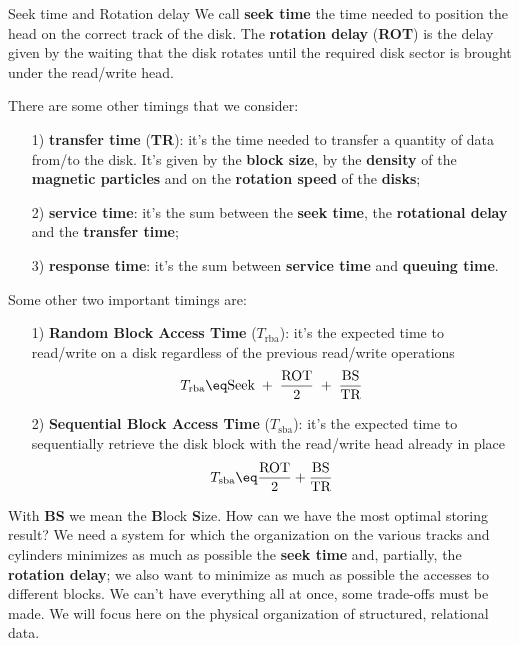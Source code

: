 \begin{definition}{Seek time and Rotation delay}
    We call \textbf{seek time} the time needed to position the head on the correct track of the disk.
    \nwl
    The \textbf{rotation delay} (\textbf{ROT}) is the delay given by the waiting that the disk rotates until the required disk sector is brought under the read/write head.
\end{definition}

There are some other timings that we consider:
\begin{itemize}
    \item [1)] \textbf{transfer time} (\textbf{TR}): it's the time needed to transfer a quantity of data from/to the disk. It's given by the \textbf{block size}, by the \textbf{density} of the \textbf{magnetic particles} and on the \textbf{rotation speed} of the \textbf{disks};
    \item [2)] \textbf{service time}: it's the sum between the \textbf{seek time}, the \textbf{rotational delay} and the \textbf{transfer time};
    \item [3)] \textbf{response time}: it's the sum between \textbf{service time} and \textbf{queuing time}.
\end{itemize}

Some other two important timings are:
\begin{itemize}
    \item [1)] \textbf{Random Block Access Time} ($T_{\text{rba}}$): it's the expected time to read/write on a disk regardless of the previous read/write operations
    \[ T_{\text{rba}} \eq \text{Seek} \; + \; \frac{\text{ROT}}{2} \; + \; \frac{\text{BS}}{\text{TR}} \]
    \item [2)] \textbf{Sequential Block Access Time} ($T_{\text{sba}}$): it's the expected time to sequentially retrieve the disk block with the read/write head already in place
    \[ T_{\text{sba}} \eq \frac{\text{ROT}}{2} + \frac{\text{BS}}{\text{TR}}\]
\end{itemize}

With \textbf{BS} we mean the \textbf{B}lock \textbf{S}ize. How can we have the most optimal storing result? We need a system for which the organization on the various tracks and cylinders minimizes as much as possible the \textbf{seek time} and, partially, the \textbf{rotation delay}; we also want to minimize as much as possible the accesses to different blocks. We can't have everything all at once, some trade-offs must be made. We will focus here on the physical organization of structured, relational data.

